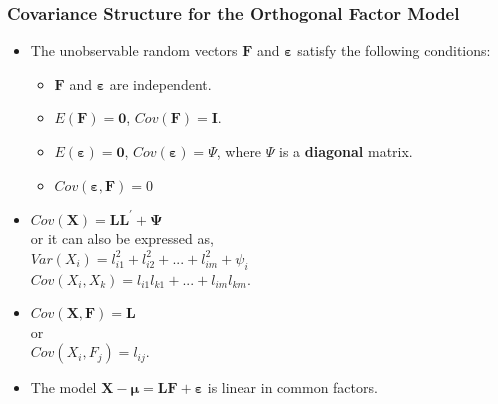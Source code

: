 \documentclass[10pt]{beamer} %
\begin{document}
\begin{frame}
   \frametitle{Covariance Structure for the Orthogonal Factor Model}
   \begin{itemize}
      \item The unobservable random vectors $\mathbf{F}$ and $\mathbf{\boldsymbol{\varepsilon}}$ satisfy the following conditions:
         \vspace{0.1cm}		
         \begin{itemize}
            \item $\mathbf{F}$ and $\mathbf{\boldsymbol{\varepsilon}}$ are independent.
            \item $E(\mathbf{F})=\mathbf{0}$, $Cov(\mathbf{F})=\mathbf{I}$.
            \item $E(\mathbf{\boldsymbol{\varepsilon}}) = \mathbf{0}$, $Cov(\mathbf{\boldsymbol{\varepsilon}}) = \Psi$, where $\Psi$ is a \textbf{diagonal} matrix. 
            \item $Cov(\mathbf{\boldsymbol{\varepsilon}}, \mathbf{F} )= 0 $
         \end{itemize}
         \vspace{0.25cm}
      \item $Cov(\mathbf{X}) = \mathbf{L}\mathbf{L}^{'}+\mathbf{\Psi}$ \\ or it can also be expressed as, \\ 
         $Var(X_i)=l_{i1}^2+l_{i2}^2+...+l_{im}^2+\psi_{i}$ \\ $Cov(X_i,X_k)=l_{i1}l_{k1}+...+l_{im}l_{km}.$
         \vspace{0.25cm}
      \item $Cov(\mathbf{X},\mathbf{F})=\mathbf{L}$ \\ or \\ $Cov(X_i,F_j) = l_{ij}.$
         \vspace{0.45cm}
      \item The model $\mathbf{X}-\boldsymbol{\mu} =
         \mathbf{L}\mathbf{F}+\mathbf{\boldsymbol{\varepsilon}}$ is linear in
         common factors.
   \end{itemize}
\end{frame}
\end{document}

